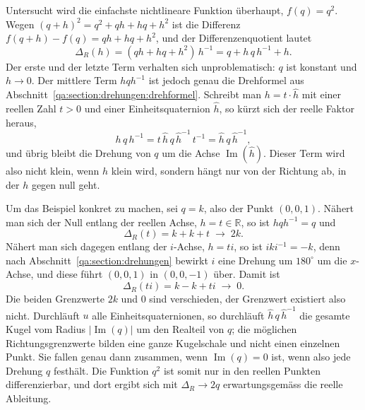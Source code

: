 \begin{beispiel}
    Untersucht wird die einfachste nichtlineare Funktion überhaupt,
    $f(q) = q^2$. Wegen $(q+h)^2 = q^2 + qh + hq + h^2$ ist die Differenz
    $f(q+h) - f(q) = qh + hq + h^2$, und der Differenzenquotient lautet
    \begin{equation*}
        \Delta_R(h) = (qh + hq + h^2)\,h^{-1}
        = q + h\,q\,h^{-1} + h .
    \end{equation*}
    Der erste und der letzte Term verhalten sich unproblematisch: $q$ ist
    konstant und $h \to 0$. Der mittlere Term $h q h^{-1}$ ist jedoch genau die
    Drehformel aus Abschnitt~\ref{qa:section:drehungen:drehformel}. Schreibt man
    $h = t \cdot \hat{h}$ mit einer reellen Zahl $t > 0$ und einer 
    Einheitsquaternion
    $\hat{h}$, so kürzt sich der reelle Faktor heraus,
    \begin{equation*}
        h\,q\,h^{-1} 
        = t\,\hat{h}\,q\,\hat{h}^{-1}\,t^{-1} 
        = \hat{h}\,q\,\hat{h}^{-1},
    \end{equation*}
    und übrig bleibt die Drehung von $q$ um die Achse $\operatorname{Im}(\hat{h})$.
    Dieser Term wird also nicht klein, wenn $h$ klein wird, sondern hängt nur von 
    der Richtung ab, in der $h$ gegen null geht.
\end{beispiel}



Um das Beispiel konkret zu machen, sei $q = k$, also der Punkt $(0,0,1)$. Nähert 
man sich der Null entlang
der reellen Achse, $h = t \in \mathbb{R}$, so ist $hqh^{-1} = q$ und
\begin{equation*}
    \Delta_R(t) 
    = k + k + t \;\rightarrow\; 2k .
\end{equation*}
Nähert man sich dagegen entlang der $i$-Achse, $h = ti$, so ist
$i k i^{-1} = -k$, denn nach Abschnitt~\ref{qa:section:drehungen} bewirkt $i$
eine Drehung um $180^\circ$ um die $x$-Achse, und diese führt $(0,0,1)$ in
$(0,0,-1)$ über. Damit ist
\begin{equation*}
    \Delta_R(ti) 
    = k - k + ti \;\rightarrow\; 0 .
\end{equation*}
Die beiden Grenzwerte $2k$ und $0$ sind verschieden, der Grenzwert existiert
also nicht. Durchläuft $u$ alle Einheitsquaternionen, so durchläuft
$\hat{h}\,q\,\hat{h}^{-1}$ die gesamte Kugel vom Radius $|\operatorname{Im}(q)|$ 
um den Realteil von $q$; die möglichen Richtungsgrenzwerte bilden eine ganze
Kugelschale und nicht einen einzelnen Punkt. Sie fallen genau dann zusammen,
wenn $\operatorname{Im}(q) = 0$ ist, wenn also jede Drehung $q$ festhält. Die
Funktion $q^2$ ist somit nur in den reellen Punkten differenzierbar, und dort
ergibt sich mit $\Delta_R \to 2q$ erwartungsgemäss die reelle Ableitung.

